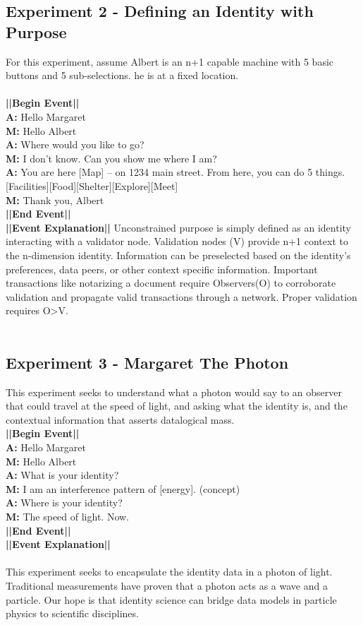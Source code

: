 \documentclass{article}
\begin{document}
\subsection{Experiment 2 - Defining an Identity with Purpose}
For this experiment, assume Albert is an n+1 capable machine with 5 basic buttons and 5 sub-selections.  he is at a fixed location. \\\\
\textbf{||Begin Event||} \\
\textbf{A:} Hello Margaret\\ 
\textbf{M:} Hello Albert \\
\textbf{A:} Where would you like to go? \\ 
\textbf{M:} I don’t know.  Can you show me where I am? \\ 
\textbf{A:} You are here [Map] – on 1234 main street.  From here, you can do 5 things. [Facilities][Food][Shelter][Explore][Meet] \\
\textbf{M:} Thank you, Albert \\
\textbf{||End Event||} \\
\textbf{||Event Explanation||} Unconstrained purpose is simply defined as an identity interacting with a validator node.  Validation nodes (V) provide n+1 context to the n-dimension identity.  Information can be preselected based on the identity’s preferences, data peers, or other context specific information.  Important transactions like notarizing a document require Observers(O) to corroborate validation and propagate valid transactions through a network.  Proper validation requires O>V. \\\\

\subsection{Experiment 3 - Margaret The Photon}
This experiment seeks to understand what a photon would say to an observer that could travel at the speed of light, and asking what the identity is, and the contextual information that asserts datalogical mass. \\
\textbf{||Begin Event||} \\
\textbf{A:} Hello Margaret \\
\textbf{M:} Hello Albert \\
\textbf{A:} What is your identity? \\
\textbf{M:} I am an interference pattern of [energy]. (concept) \\
\textbf{A:} Where is your identity? \\
\textbf{M:} The speed of light. Now. \\
\textbf{||End Event||} \\
\textbf{||Event Explanation||}\\\\
This experiment seeks to encapsulate the identity data in a photon of light.  Traditional measurements have proven that a photon acts as a wave and a particle.  Our hope is that identity science can bridge data models in particle physics to scientific disciplines.
\end{document}

